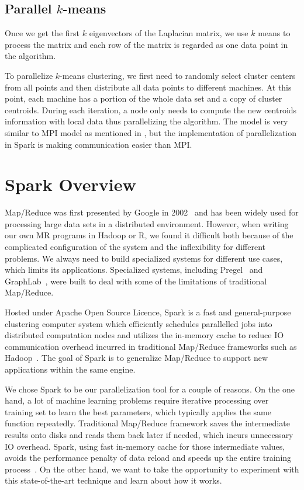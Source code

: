 \documentclass{acm_proc_article-sp}
\begin{document}
\subsection{Parallel $k$-means}
Once we get the first $k$ eigenvectors of the Laplacian matrix, we use $k$ means to process the matrix and each row of the matrix is regarded as one data point in the algorithm.

To parallelize $k$-means clustering, we first need to randomly select cluster centers from all points and then distribute all data points to different machines. At this point, each machine has a portion of the whole data set and a copy of cluster centroids. During each iteration, a node only needs to compute the new centroids information with local data thus parallelizing the algorithm. The model is very similar to MPI model as mentioned in \cite{chen2011parallel}, but the implementation of parallelization in Spark is making communication easier than MPI.


\section{Spark Overview}
Map/Reduce was first presented by Google in 2002~\cite{dean2008mapreduce} and has been widely used for processing large data sets in a distributed environment. However, when writing our own MR programs in Hadoop or R, we found it difficult both because of the complicated configuration of the system and the inflexibility for different problems. We always need to build specialized systems for different use cases, which limits its applications. Specialized systems, including Pregel~\cite{malewicz2010pregel} and  GraphLab~\cite{low2014graphlab}, were built to deal with some of the limitations of traditional Map/Reduce.

Hosted under Apache Open Source Licence, Spark is a fast and general-purpose clustering computer system which efficiently schedules parallelled jobs into distributed computation nodes and utilizes the in-memory cache to reduce IO communication overhead incurred in traditional Map/Reduce frameworks such as Hadoop~\cite{zaharia2010spark}. The goal of Spark is to generalize Map/Reduce to support new applications within the same engine. 

We chose Spark to be our parallelization tool for a couple of reasons. On the one hand, a lot of machine learning problems require iterative processing over training set to learn the best parameters, which typically applies the same function repeatedly. Traditional Map/Reduce framework saves the intermediate results onto disks and reads them back later if needed, which incurs unnecessary IO overhead. Spark, using fast in-memory cache for those intermediate values, avoids the performance penalty of data reload and speeds up the entire training process~\cite{zaharia2010spark}. On the other hand, we want to take the opportunity to experiment with this state-of-the-art technique and learn about how it works.
\end{document}
